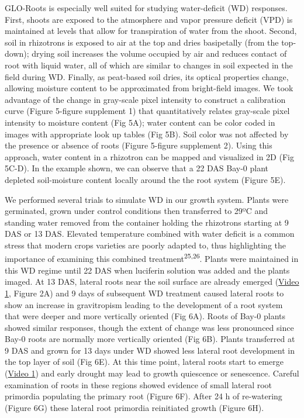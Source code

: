 \documentclass[]{article}
\begin{document}
GLO-Roots is especially well suited for studying water-deficit (WD)
responses. First, shoots are exposed to the atmosphere and vapor
pressure deficit (VPD) is maintained at levels that allow for
transpiration of water from the shoot. Second, soil in rhizotrons is
exposed to air at the top and dries basipetally (from the top-down);
drying soil increases the volume occupied by air and reduces contact of
root with liquid water, all of which are similar to changes in soil
expected in the field during WD. Finally, as peat-based soil dries, its
optical properties change, allowing moisture content to be approximated
from bright-field images. We took advantage of the change in gray-scale
pixel intensity to construct a calibration curve (Figure 5-figure
supplement 1) that quantitatively relates gray-scale pixel intensity to
moisture content (Fig 5A); water content can be color coded in images
with appropriate look up tables (Fig 5B). Soil color was not affected by
the presence or absence of roots (Figure 5-figure supplement 2). Using
this approach, water content in a rhizotron can be mapped and visualized
in 2D (Fig 5C-D). In the example shown, we can observe that a 22 DAS
Bay-0 plant depleted soil-moisture content locally around the the root
system (Figure 5E).

We performed several trials to simulate WD in our growth system. Plants
were germinated, grown under control conditions then transferred to 29ºC
and standing water removed from the container holding the rhizotrons
starting at 9 DAS or 13 DAS. Elevated temperature combined with water
deficit is a common stress that modern crops varieties are poorly
adapted to, thus highlighting the importance of examining this combined
treatment\textsuperscript{25,26}. Plants were maintained in this WD
regime until 22 DAS when luciferin solution was added and the plants
imaged. At 13 DAS, lateral roots near the soil surface are already
emerged
(\href{https://www.dropbox.com/s/sxjc04o0yj2faif/Video_1.avi?dl=0}{Video
1}, Figure 2A) and 9 days of subsequent WD treatment caused lateral
roots to show an increase in gravitropism leading to the development of
a root system that were deeper and more vertically oriented (Fig 6A).
Roots of Bay-0 plants showed similar responses, though the extent of
change was less pronounced since Bay-0 roots are normally more
vertically oriented (Fig 6B). Plants transferred at 9 DAS and grown for
13 days under WD showed less lateral root development in the top layer
of soil (Fig 6E). At this time point, lateral roots start to emerge
(\href{https://www.dropbox.com/s/sxjc04o0yj2faif/Video_1.avi?dl=0}{Video
1}) and early drought may lead to growth quiescence or senescence.
Careful examination of roots in these regions showed evidence of small
lateral root primordia populating the primary root (Figure 6F). After 24
h of re-watering (Figure 6G) these lateral root primordia reinitiated
growth (Figure 6H).
\end{document}
